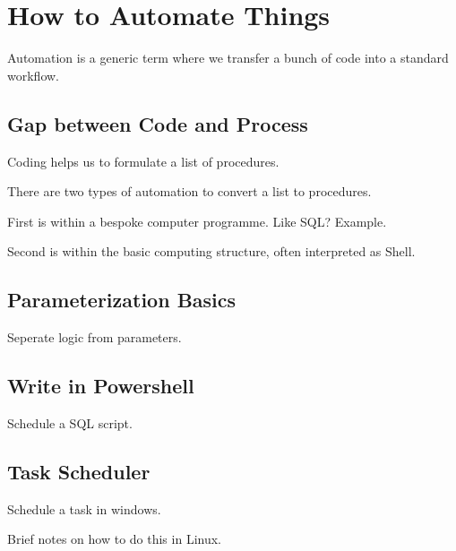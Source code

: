 \section{How to Automate Things} 

Automation is a generic term where we transfer a bunch of code into a standard workflow.  

\subsection{Gap between Code and Process}

Coding helps us to formulate a list of procedures.  

There are two types of automation to convert a list to procedures.

First is within a bespoke computer programme.  Like SQL? Example.

Second is within the basic computing structure, often interpreted as Shell.  

\subsection{Parameterization Basics}

Seperate logic from parameters.  

\subsection{Write in Powershell}

Schedule a SQL script.  

\subsection{Task Scheduler}

Schedule a task in windows.  

Brief notes on how to do this in Linux.  

\newpage
